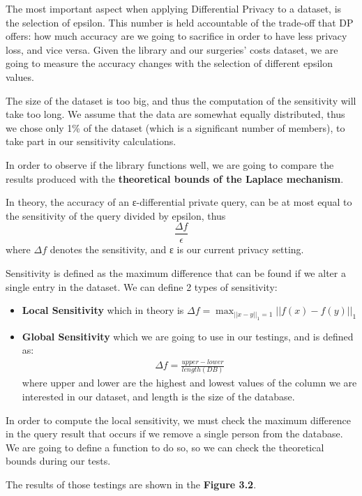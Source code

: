 The most important aspect when applying Differential Privacy to a dataset, is the selection of epsilon. This number is held accountable of the trade-off that DP offers: how much accuracy are we going to sacrifice in order to have less privacy loss, and vice versa. Given the library and our surgeries' costs dataset, we are going to measure the accuracy changes with the selection of different epsilon values.

The size of the dataset is too big, and thus the computation of the sensitivity will take too long. We assume that the data are somewhat equally distributed, thus we chose only 1\% of the dataset (which is a significant number of members), to take part in our sensitivity calculations.

In order to observe if the library functions well, we are going to compare the results produced with the \textbf{theoretical bounds of the Laplace mechanism}. 

In theory, the accuracy of an ε-differential private query, can be at most equal to the sensitivity of the query divided by epsilon, thus $$\frac{\Delta f}{\epsilon}$$ where $\Delta f$ denotes the sensitivity, and ε is our current privacy setting. 

Sensitivity is defined as the maximum difference that can be found if we alter a single entry in the dataset. We can define 2 types of sensitivity:

\begin{itemize}
    \item \textbf{Local Sensitivity} which in theory is $ \Delta f = \max_{||x-y||_1 = 1} ||f(x)-f(y)||_1$
    \item \textbf{Global Sensitivity} which we are going to use in our testings, and is defined as:
    \begin{align*}
        \Delta f = \frac{upper - lower}{length(DB)}
    \end{align*} where upper and lower are the highest and lowest values of the column we are interested in our dataset, and length is the size of the database.
\end{itemize}

In order to compute the local sensitivity, we must check the maximum difference in the query result that occurs if we remove a single person from the database. We are going to define a function to do so, so we can check the theoretical bounds during our tests.

The results of those testings are shown in the \textbf{Figure 3.2}.

